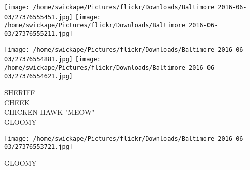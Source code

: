 \documentclass[10pt,letterpaper]{article}
\begin{document}
\texttt{[image: /home/swickape/Pictures/flickr/Downloads/Baltimore 2016-06-03/27376555451.jpg]}
\texttt{[image: /home/swickape/Pictures/flickr/Downloads/Baltimore 2016-06-03/27376555211.jpg]}

\texttt{[image: /home/swickape/Pictures/flickr/Downloads/Baltimore 2016-06-03/27376554881.jpg]}
\texttt{[image: /home/swickape/Pictures/flickr/Downloads/Baltimore 2016-06-03/27376554621.jpg]}

SHERIFF\\
CHEEK\\
CHICKEN HAWK "MEOW"\\
GLOOMY\\
\pagebreak

\texttt{[image: /home/swickape/Pictures/flickr/Downloads/Baltimore 2016-06-03/27376553721.jpg]}

GLOOMY\\
\pagebreak
\end{document}
